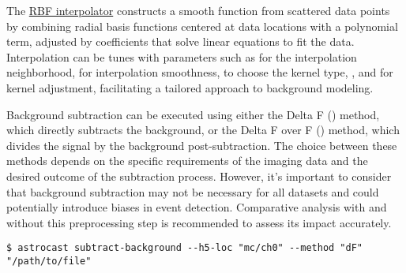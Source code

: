 The \href{https://docs.scipy.org/doc/scipy/reference/generated/scipy.interpolate.RBFInterpolator.html}{RBF interpolator} constructs a smooth function from scattered data points by combining radial basis functions centered at data locations with a polynomial term\citep{fasshauer_meshfree_2007}, adjusted by coefficients that solve linear equations to fit the data. Interpolation can be tunes with parameters such as  for the interpolation neighborhood,  for interpolation smoothness,  to choose the kernel type, , and  for kernel adjustment, facilitating a tailored approach to background modeling.

Background subtraction can be executed using either the Delta F () method, which directly subtracts the background, or the Delta F over F () method, which divides the signal by the background post-subtraction. The choice between these methods depends on the specific requirements of the imaging data and the desired outcome of the subtraction process. However, it's important to consider that background subtraction may not be necessary for all datasets and could potentially introduce biases in event detection. Comparative analysis with and without this preprocessing step is recommended to assess its impact accurately.

\begin{lstlisting}[style=bashStyle]
    $ astrocast subtract-background --h5-loc "mc/ch0" --method "dF" "/path/to/file"
\end{lstlisting}